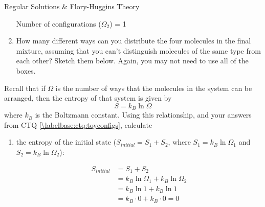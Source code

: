 \begin{activity}{Regular Solutions \& Flory-Huggins Theory}
\begin{ctqs}
\begin{enumerate}
\begin{solution}
{						\vspace{0.1in}
						\centerline{Number of configurations ($\Omega_2$) = 1}
					}
				\end{solution}
			
			\item How many different ways can you distribute the four molecules in the final mixture, assuming that you can't distinguish molecules of the same type from each other?  Sketch them below.  Again, you may not need to use all of the boxes.
			
				\begin{solution}
				\end{solution}
		\end{enumerate}
		
	\question Recall that if $\Omega$ is the number of ways that the molecules in the system can be arranged, then the entropy of that system is given by
		\begin{equation*}
			S = k_B \ln \Omega
		\end{equation*} 
		where $k_B$ is the Boltzmann constant.  Using this relationship, and your answers from CTQ \ref{\labelbase:ctq:toyconfigs}, calculate
			
		\begin{enumerate}
			\item the entropy of the initial state ($S_{initial} = S_1 + S_2$, where $S_1 = k_B\ln \Omega_1$ and $S_2 = k_B \ln \Omega_2$):
			
				\begin{solution}[1in]
					\begin{align*}
						S_{initial} &= S_1 + S_2 \\
							&= k_B\ln\Omega_1 + k_B\ln\Omega_2\\
							&= k_B \ln 1 + k_B \ln 1 \\
							&= k_B\cdot 0 + k_B\cdot 0 = 0
					\end{align*}
				\end{solution}
				

\end{enumerate}
\end{ctqs}
\end{activity}
